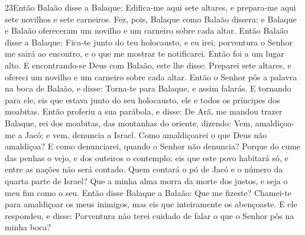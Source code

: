 \medskip

\lettrine{23} Então Balaão disse a Balaque: Edifica-me aqui
sete altares, e prepara-me aqui sete novilhos e sete carneiros.
Fez, pois, Balaque como Balaão dissera: e Balaque e Balaão
ofereceram um novilho e um carneiro sobre cada altar. Então
Balaão disse a Balaque: Fica-te junto do teu holocausto, e eu irei;
porventura o Senhor me sairá ao encontro, e o que me mostrar te
notificarei. Então foi a um lugar alto. E encontrando-se Deus
com Balaão, este lhe disse: Preparei sete altares, e ofereci um
novilho e um carneiro sobre cada altar. Então o Senhor pôs a
palavra na boca de Balaão, e disse: Torna-te para Balaque, e assim
falarás. E tornando para ele, eis que estava junto do seu
holocausto, ele e todos os príncipes dos moabitas. Então
proferiu a sua parábola, e disse: De Arã, me mandou trazer Balaque,
rei dos moabitas, das montanhas do oriente, dizendo: Vem,
amaldiçoa-me a Jacó; e vem, denuncia a Israel. Como amaldiçoarei
o que Deus não amaldiçoa? E como denunciarei, quando o Senhor não
denuncia? Porque do cume das penhas o vejo, e dos outeiros o
contemplo; eis que este povo habitará só, e entre as nações não será
contado. Quem contará o pó de Jacó e o número da quarta parte
de Israel? Que a minha alma morra da morte dos justos, e seja o meu
fim como o seu. Então disse Balaque a Balaão: Que me fizeste?
Chamei-te para amaldiçoar os meus inimigos, mas eis que inteiramente
os abençoaste. E ele respondeu, e disse: Porventura não terei
cuidado de falar o que o Senhor pôs na minha boca?

